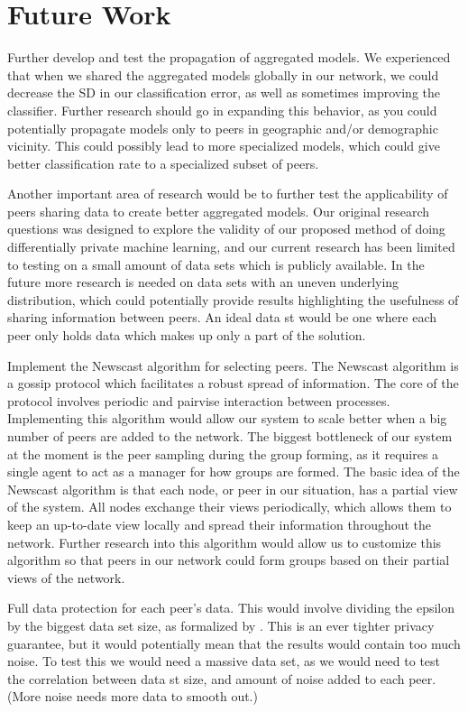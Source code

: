 \section{Future Work} \label{sec:Future Work}

Further develop and test the propagation of aggregated models. We experienced that when we shared the aggregated models globally in our network, we could decrease the SD in our classification error, as well as sometimes improving the classifier. Further research should go in expanding this behavior, as you could potentially propagate models only to peers in geographic and/or demographic vicinity. This could possibly lead to more specialized models, which could give better classification rate to a specialized subset of peers. 

Another important area of research would be to further test the applicability of peers sharing data to create better aggregated models. Our original research questions was designed to explore the validity of our proposed method of doing differentially private machine learning, and our current research has been limited to testing on a small amount of data sets which is publicly available. In the future more research is needed on data sets with an uneven underlying distribution, which could potentially provide results highlighting the usefulness of sharing information between peers. An ideal data st would be one where each peer only holds data which makes up only a part of the solution. 

Implement the Newscast algorithm for selecting peers. The Newscast algorithm is a gossip protocol which facilitates a robust spread of information. The core of the protocol involves periodic and pairvise interaction between processes. Implementing this algorithm would allow our system to scale better when a big number of peers are added to the network. The biggest bottleneck of our system at the moment is the peer sampling during the group forming, as it requires a single agent to act as a manager for how groups are formed. The basic idea of the Newscast algorithm is that each node, or peer in our situation, has a partial view of the system. All nodes exchange their views periodically, which allows them to keep an up-to-date view locally and spread their information throughout the network. Further research into this algorithm would allow us to customize this algorithm so that peers in our network could form groups based on their partial views of the network. 

Full data protection for each peer's data. This would involve dividing the epsilon by the biggest data set size, as formalized by \cite{dwork2013algorithmic}. This is an ever tighter privacy guarantee, but it would potentially mean that the results would contain too much noise. To test this we would need a massive data set, as we would need to test the correlation between data st size, and amount of noise added to each peer. (More noise needs more data to smooth out.)


